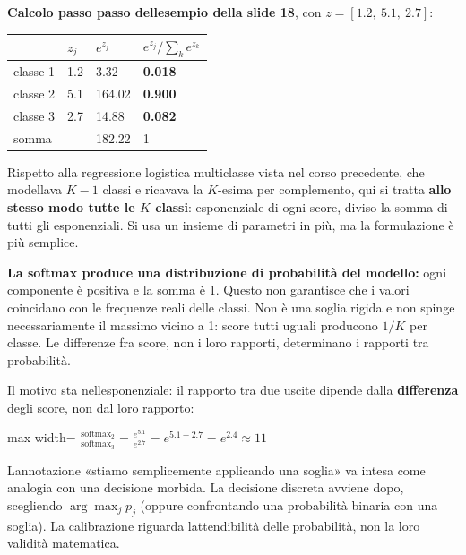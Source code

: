 \documentclass[11pt,a4paper,oneside,openany]{book}
\begin{document}
\textbf{Calcolo passo passo dell\textquotesingle esempio della slide 18}, con \(z = [1.2,\ 5.1,\ 2.7]\):

\begin{longtable}[]{@{}llll@{}}
\toprule\noalign{}
& \(z_j\) & \(e^{z_j}\) & \(e^{z_j} / \sum_k e^{z_k}\) \\
\midrule\noalign{}
\endhead
\bottomrule\noalign{}
\endlastfoot
classe 1 & 1.2 & 3.32 & \textbf{0.018} \\
classe 2 & 5.1 & 164.02 & \textbf{0.900} \\
classe 3 & 2.7 & 14.88 & \textbf{0.082} \\
somma & & 182.22 & 1 \\
\end{longtable}

Rispetto alla regressione logistica multiclasse vista nel corso precedente, che modellava \(K-1\) classi e ricavava la \(K\)-esima per complemento, qui si tratta \textbf{allo stesso modo tutte le \(K\) classi}: esponenziale di ogni score, diviso la somma di tutti gli esponenziali. Si usa un insieme di parametri in più, ma la formulazione è più semplice.

\textbf{La softmax produce una distribuzione di probabilità del modello:} ogni componente è positiva e la somma è 1. Questo non garantisce che i valori coincidano con le frequenze reali delle classi. Non è una soglia rigida e non spinge necessariamente il massimo vicino a 1: score tutti uguali producono \(1/K\) per classe. Le differenze fra score, non i loro rapporti, determinano i rapporti tra probabilità.

Il motivo sta nell\textquotesingle esponenziale: il rapporto tra due uscite dipende dalla \textbf{differenza} degli score, non dal loro rapporto:

\begin{center}
\begin{adjustbox}{max width=\linewidth}
$\displaystyle 
\frac{\text{softmax}_2}{\text{softmax}_3} = \frac{e^{5.1}}{e^{2.7}} = e^{5.1-2.7} = e^{2.4} \approx 11
$
\end{adjustbox}
\end{center}

L\textquotesingle annotazione «stiamo semplicemente applicando una soglia» va intesa come analogia con una decisione morbida. La decisione discreta avviene dopo, scegliendo \(\arg\max_j p_j\) (oppure confrontando una probabilità binaria con una soglia). La calibrazione riguarda l\textquotesingle attendibilità delle probabilità, non la loro validità matematica.
\end{document}
